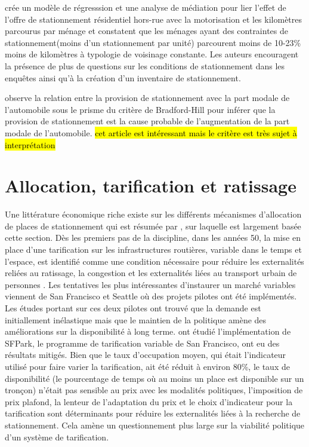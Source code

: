 \textcite{Currans:HouseholdsConstrained:2023} crée un modèle de régresssion et une analyse de médiation pour lier l'effet de l'offre de stationnement résidentiel hors-rue avec la motorisation et les kilomètres parcourus par ménage et constatent que les ménages ayant des contraintes de stationnement(moins d'un stationnement par unité) parcourent moins de 10-23\% moins de kilomètres à typologie de voisinage constante. Les auteurs encouragent la présence de plus de questions sur les conditions de stationnement dans les enquêtes ainsi qu'à la création d'un inventaire de stationnement. \par
\textcite{McCahill:EffectsParking:2016} observe la relation entre la provision de stationnement avec la part modale de l'automobile sous le prisme du critère de Bradford-Hill pour inférer que la provision de stationnement est la cause probable de l'augmentation de la part modale de l'automobile. \hl{cet article est intéressant mais le critère est très sujet à interprétation}

\section{Allocation, tarification et ratissage}

Une littérature économique riche existe sur les différents mécanismes d'allocation de places de stationnement qui est résumée par \textcite{Inci:ReviewEconomics:2015}, sur laquelle est largement basée cette section. Dès les premiers pas de la discipline, dans les années 50, la mise en place d'une tarification sur les infrastructures routières, variable dans le temps et l'espace, est identifié comme une condition nécessaire pour réduire les externalités reliées au ratissage, la congestion et les externalités liées au transport urbain de personnes \parencite{Vickrey:StatementJoint:1994}. Les tentatives les plus intéressantes d'instaurer un marché variables viennent de San Francisco et Seattle où des projets pilotes ont été implémentés. Les études portant sur ces deux pilotes ont trouvé que la demande est initiallement inélastique mais que le maintien de la politique amène des améliorations sur la disponibilité à long terme. \textcite{Chatman:TheoryImplementation:2014} ont étudié l'implémentation de SFPark, le programme de tarification variable de San Francisco, ont eu des résultats mitigés. Bien que le taux d'occupation moyen, qui était l'indicateur utilisé pour faire varier la tarification,  ait été réduit à environ 80\%, le taux de disponibilité (le pourcentage de temps où au moins un place est disponible sur un tronçon) n'était pas sensible au prix avec les modalités politiques, l'imposition de prix plafond, la lenteur de l'adaptation du prix et le choix d'indicateur pour la tarification sont déterminants pour réduire les externalités liées à la recherche de stationnement. Cela amène un questionnement plus large sur la viabilité politique d'un système de tarification.\par


